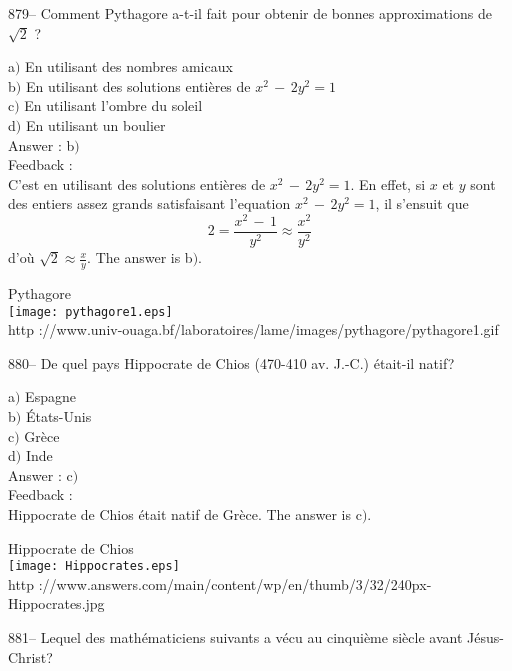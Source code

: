 ﻿\documentclass[letterpaper, 12pt]{article}
\begin{document}
879-- Comment Pythagore a-t-il fait pour obtenir de bonnes
approximations de $\sqrt2$ ?

a$)$ En utilisant des nombres amicaux \\
b$)$ En utilisant des solutions enti\`eres de $x^2\,-\,2y^2=1$ \\
c$)$ En utilisant l'ombre du soleil \\
d$)$ En utilisant un boulier\\

Answer : b$)$\\

Feedback : \\
C'est en utilisant des solutions enti\`eres de $x^2\,-\,2y^2=1$. En
effet, si $x$ et $y$ sont des entiers assez grands satisfaisant
l'equation $x^2\,-\,2y^2=1$, il s'ensuit que
$$2=\displaystyle{\frac{x^2\,-\,1}{y^2}\approx\frac{x^2}{y^2}}$$
d'o\`u $\sqrt2\approx\frac xy$. The answer is b$)$.\\

        \begin{center}
        Pythagore\\
    \texttt{[image: pythagore1.eps]}\\
        {\footnotesize http
://www.univ-ouaga.bf/laboratoires/lame/images/pythagore/pythagore1.gif}
    \end{center}

880-- De quel pays Hippocrate de Chios (470-410 av. J.-C.)
\'etait-il natif?

a$)$ Espagne \\
b$)$ \'Etats-Unis \\
c$)$ Gr\`ece \\
d$)$ Inde\\

Answer : c$)$\\

Feedback : \\
Hippocrate de Chios \'etait natif de Gr\`ece. The answer is c$)$.\\

        \begin{center}
        Hippocrate de Chios\\
    \texttt{[image: Hippocrates.eps]}\\
        {\footnotesize http
://www.answers.com/main/content/wp/en/thumb/3/32/240px-Hippocrates.jpg}
    \end{center}

881-- Lequel des math\'ematiciens suivants a v\'ecu au cinqui\`eme
si\`ecle avant J\'esus-Christ?
\end{document}
